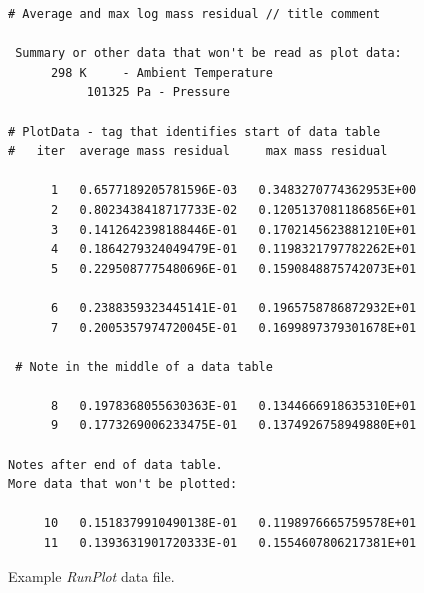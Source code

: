 \documentclass[12pt,twoside]{article}
\newcommand{\prog}[1]{\textsl{#1}}
\numberwithin{equation}{section}
\begin{document}
\begin{figure}[hbp]
\centering

\begin{Sbox}
\begin{minipage}{5in}

\begin{verbatim}
# Average and max log mass residual // title comment

 Summary or other data that won't be read as plot data:
      298 K     - Ambient Temperature
           101325 Pa - Pressure
           
# PlotData - tag that identifies start of data table
#   iter  average mass residual     max mass residual

      1   0.6577189205781596E-03   0.3483270774362953E+00
      2   0.8023438418717733E-02   0.1205137081186856E+01
      3   0.1412642398188446E-01   0.1702145623881210E+01
      4   0.1864279324049479E-01   0.1198321797782262E+01
      5   0.2295087775480696E-01   0.1590848875742073E+01

      6   0.2388359323445141E-01   0.1965758786872932E+01
      7   0.2005357974720045E-01   0.1699897379301678E+01

 # Note in the middle of a data table

      8   0.1978368055630363E-01   0.1344666918635310E+01
      9   0.1773269006233475E-01   0.1374926758949880E+01

Notes after end of data table.
More data that won't be plotted:

     10   0.1518379910490138E-01   0.1198976665759578E+01
     11   0.1393631901720333E-01   0.1554607806217381E+01
\end{verbatim}
\end{minipage}
\end{Sbox}
\fbox{\TheSbox}
\caption{Example \prog{RunPlot} data file.}
\label{samplefile}
\end{figure}
\end{document}
